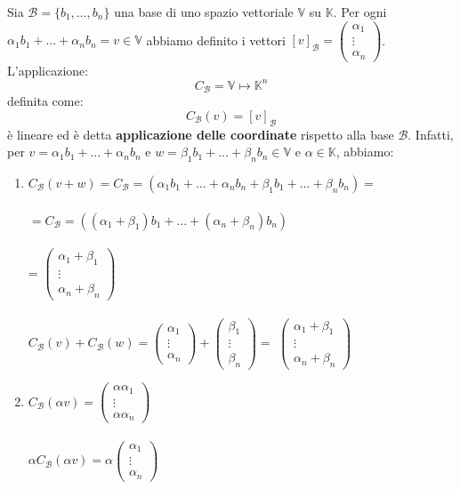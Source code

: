 \documentclass[12pt]{article}
\begin{document}
Sia $\mathcal{B} = \{b_1, \dots, b_n\}$ una base di uno spazio vettoriale $\mathbb{V}$ su $\mathbb{K}$. Per ogni $\alpha_1 b_1 + \dots + \alpha_n b_n = v \in \mathbb{V}$ abbiamo definito i vettori $[v]_{\mathcal{B}} = \begin{pmatrix}
    \alpha_1\\
    \vdots\\
    \alpha_n
\end{pmatrix}$. L'applicazione:
\[C_{\mathcal{B}} = \mathbb{V} \mapsto \mathbb{K}^n\]
definita come:
\[C_{\mathcal{B}}(v) = [v]_{\mathcal{B}}\]
è lineare ed è detta \textbf{applicazione delle coordinate} rispetto alla base $\mathcal{B}$.
Infatti, per $v = \alpha_1b_1 + \dots + \alpha_nb_n$ e $w = \beta_1b_1 + \dots + \beta_nb_n \in \mathbb{V}$ e $\alpha \in \mathbb{K}$, abbiamo:
\begin{enumerate}
    \item $C_{\mathcal{B}}(v+w) = C_{\mathcal{B}} = (\alpha_1b_1 + \dots + \alpha_nb_n + \beta_1b_1 + \dots + \beta_nb_n) = $\\\\
    $= C_{\mathcal{B}} = ((\alpha_1 + \beta_1)b_1 + \dots + (\alpha_n + \beta_n)b_n)$\\\\
    = $\begin{pmatrix}
        \alpha_1 + \beta_1\\
        \vdots\\
        \alpha_n + \beta_n
    \end{pmatrix}$
    \\\\
    $C_{\mathcal{B}}(v) + C_{\mathcal{B}}(w) = \begin{pmatrix}
        \alpha_1\\
        \vdots\\
        \alpha_n
    \end{pmatrix} + \begin{pmatrix}
        \beta_1\\
        \vdots\\
        \beta_n
    \end{pmatrix} = $
    $\begin{pmatrix}
        \alpha_1 + \beta_1\\
        \vdots\\
        \alpha_n + \beta_n
    \end{pmatrix}$
    \item $C_{\mathcal{B}}(\alpha v) = \begin{pmatrix}
        \alpha \alpha_1\\
        \vdots\\
        \alpha \alpha_n
    \end{pmatrix}$
    \\\\
    $\alpha C_{\mathcal{B}}(\alpha v) = \alpha \begin{pmatrix}
        \alpha_1\\
        \vdots\\
        \alpha_n
    \end{pmatrix}$
\end{enumerate}
\end{document}
